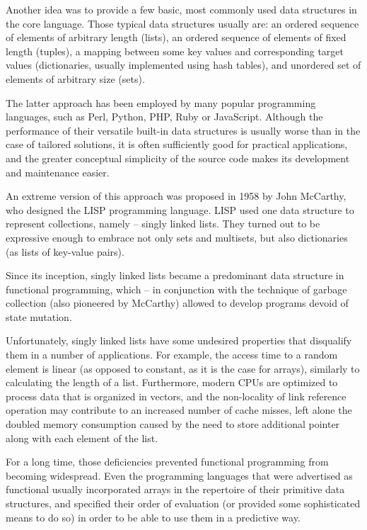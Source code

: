 Another idea was to provide a few basic, most commonly used
data structures in the core language. Those typical data structures
usually are: an ordered sequence of elements of arbitrary length
(lists), an ordered sequence of elements of fixed length (tuples),
a mapping between some key values and corresponding target values
(dictionaries, usually implemented using hash tables), and
unordered set of elements of arbitrary size (sets).

The latter approach has been employed by many popular programming
languages, such as Perl, Python, PHP, Ruby or JavaScript. Although
the performance of their versatile built-in data structures
is usually worse than in the case of tailored solutions, it
is often sufficiently good for practical applications, and the greater
conceptual simplicity of the source code makes its development
and maintenance easier.

An extreme version of this approach was proposed in 1958 by John McCarthy,
who designed the LISP programming language\cite{McCarthy1960}. LISP
used one data structure to represent collections, namely -- singly
linked lists. They turned out to be expressive enough to embrace
not only sets and multisets, but also dictionaries (as lists of key-value
pairs).

Since its inception, singly linked lists became a predominant data structure
in functional programming\cite{Bagwell2002}, which -- in conjunction
with the technique of garbage collection (also pioneered by McCarthy)
allowed to develop programs devoid of state mutation.

Unfortunately, singly linked lists have some undesired properties
that disqualify them in a number of applications. For example,
the access time to a random element is linear (as opposed to
constant, as it is the case for arrays), similarly to calculating
the length of a list. Furthermore, modern CPUs are optimized
to process data that is organized in vectors, and the non-locality
of link reference operation may contribute to an increased number
of cache misses, left alone the doubled memory consumption
caused by the need to store additional pointer along with each
element of the list.

For a long time, those deficiencies prevented functional programming
from becoming widespread. Even the programming languages that were
advertised as functional usually incorporated arrays in the repertoire
of their primitive data structures, and specified their order
of evaluation\cite{R5RS} (or provided some sophisticated means
to do so\cite{Wadler1995}) in order to be able to use them
in a predictive way.

